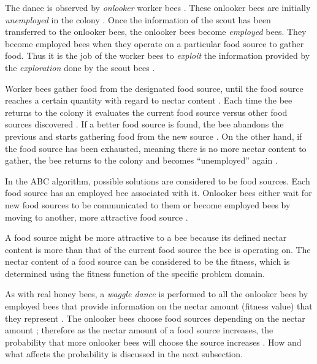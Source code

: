 The dance is observed by \emph{onlooker} worker bees \cite{ABCCompareStudy,ABCImageEnhancement}. These onlooker bees are initially \emph{unemployed} in the colony \cite{ABCCompareStudy,ABCImageEnhancement}. Once the information of the scout has been transferred to the onlooker bees, the onlooker bees become \emph{employed} bees\cite{ABCCompareStudy,ABCImageEnhancement}. They become employed bees when they operate on a particular food source to gather food\cite{ABCCompareStudy,ABCImageEnhancement}. Thus it is the job of the worker bees to \emph{exploit} the information provided by the \emph{exploration} done by the scout bees \cite{ABCCompareStudy,ABCNumericalOptimization}. 

Worker bees gather food from the designated food source, until the food source reaches a certain quantity with regard to nectar content \cite{ABCCompareStudy,ABCNumericalOptimization}. Each time the bee returns to the colony it evaluates the current food source versus other food sources discovered \cite{ABCCompareStudy,ABCNumericalOptimization}. If a better food source is found, the bee abandons the previous and starts gathering food from the new source \cite{ABCCompareStudy,ABCNumericalOptimization}. On the other hand, if the food source has been exhausted, meaning there is no more nectar content to gather, the bee returns to the colony and becomes ``unemployed'' again \cite{ABCCompareStudy,ABCNumericalOptimization}.

In the ABC algorithm, possible solutions are considered to be food sources\cite{ABCCompareStudy,ABCNumericalOptimization}. Each food source has an employed bee associated with it. Onlooker bees either wait for new food sources to be communicated to them or become employed bees by moving to another, more attractive food source \cite{ABCCompareStudy,ABCNumericalOptimization}. 

A food source might be more attractive to a bee because its defined nectar content is more than that of the current food source the bee is operating on\cite{ABCCompareStudy,ABCNumericalOptimization}. The nectar content of a food source can be considered to be the fitness, which is determined using the fitness function of the specific problem domain\cite{ABCCompareStudy,ABCNumericalOptimization}.

As with real honey bees, a \emph{waggle dance} is performed to all the onlooker bees by employed bees that provide information on the nectar amount (fitness value) that they represent \cite{ABCReconfigDistro,ABCCompareStudy,ABCImageEnhancement}. The onlooker bees choose food sources depending on the nectar amount \cite{ABCReconfigDistro,ABCCompareStudy,ABCImageEnhancement}; therefore as the nectar amount of a food source increases, the probability that more onlooker bees will choose the source increases \cite{ABCReconfigDistro,ABCCompareStudy,ABCImageEnhancement}. How and what affects the probability is discussed in the next subsection.


